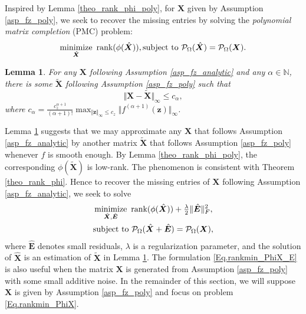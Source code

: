\documentclass[letterpaper]{article} %
\newtheorem{lemma}{Lemma}
\begin{document}
Inspired by Lemma \ref{theo_rank_phi_poly}, for $\bm{X}$ given by Assumption \ref{asp_fz_poly},  we seek to recover the missing entries
by solving the \emph{polynomial matrix completion} (PMC) problem:
\begin{equation}\label{Eq.rankmin_PhiX}
\mathop{\text{minimize}}_{\hat{\bm{X}}}\ \textup{rank}(\phi(\hat{\bm{X}})),
\textup{subject to}\ \mathcal{P}_{\Omega}(\hat{\bm{X}})=\mathcal{P}_{\Omega}(\bm{X}).
\end{equation}
\begin{lemma}\label{theo_assump12}
For any $\bm{X}$ following Assumption \ref{asp_fz_analytic}
and any $\alpha \in \mathbb{N}$,
there is some $\tilde{\bm{X}}$ following Assumption \ref{asp_fz_poly} such that
$$\Vert\bm{X}-\tilde{\bm{X}}\Vert_{\infty}\leq c_{\alpha},$$
where $c_{\alpha}=\tfrac{c_z^{\alpha+1}}{(\alpha+1)!}\max_{\Vert \bm{z}\Vert_{\infty} \leq c_z}\Vert f^{(\alpha+1)}(\bm{z})\Vert_\infty$.
\end{lemma}
Lemma \ref{theo_assump12} suggests that we may approximate
any $\bm{X}$ that follows Assumption \ref{asp_fz_analytic} by
another matrix $\tilde{\bm{X}}$ that follows Assumption \ref{asp_fz_poly}
whenever $f$ is smooth enough.
By Lemma \ref{theo_rank_phi_poly}, the corresponding $\phi(\tilde{\bm{X}})$ is low-rank.
The phenomenon is consistent with Theorem \ref{theo_rank_phi}.
Hence to recover the missing entries of $\bm{X}$ following Assumption \ref{asp_fz_analytic}, we seek to solve
\begin{equation}\label{Eq.rankmin_PhiX_E}
\begin{aligned}
&\mathop{\text{minimize}}_{\hat{\bm{X}},\hat{\bm{E}}}\ \textup{rank}(\phi(\hat{\bm{X}}))+\tfrac{\lambda}{2}\Vert\hat{\bm{E}}\Vert_F^2,\\
&\textup{subject to}\ \mathcal{P}_{\Omega}(\hat{\bm{X}}+\hat{\bm{E}})=\mathcal{P}_{\Omega}(\bm{X}),
\end{aligned}
\end{equation}
where $\hat{\bm{E}}$ denotes small residuals, $\lambda$ is a regularization parameter, and the solution of $\hat{\bm{X}}$ is an estimation of $\tilde{\bm{X}}$ in Lemma \ref{theo_assump12}.
The formulation \eqref{Eq.rankmin_PhiX_E} is also useful when
the matrix $\bm{X}$ is generated from Assumption \ref{asp_fz_poly}
with some small additive noise.
In the remainder of this section,
we will suppose $\bm{X}$ is given by Assumption \ref{asp_fz_poly}
and focus on problem \eqref{Eq.rankmin_PhiX}.
\end{document}
